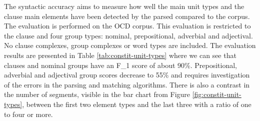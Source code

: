 \begin{table}[!ht]
    \caption{The evaluation statistics for the main constituency unit types}
    \label{tab:constit-unit-types}
\end{table}

The syntactic accuracy aims to measure how well the main unit types and the clause main elements have been detected by the parsed compared to the corpus. The evaluation is performed on the OCD corpus. This evaluation is restricted to the clause and four group types: nominal, prepositional, adverbial and adjectival. No clause complexes, group complexes or word types are included. The evaluation results are presented in Table \ref{tab:constit-unit-types} where we can see that clauses and nominal groups have an F_1 score of about 90\%. Prepositional, adverbial and adjectival group scores decrease to 55\% and requires investigation of the errors in the parsing and matching algorithms. There is also a contrast in the number of segments, visible in the bar chart from Figure \ref{fig:constit-unit-types}, between the first two element types and the last three with a ratio of one to four or more.

